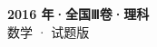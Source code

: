 \documentclass[zihao=-4, a4paper]{ctexart}
\begin{document}
\begin{center}
  {\Large\bfseries 2016 年·全国Ⅲ卷·理科}\\[4pt]
  {\large 数学 · 试题版}
\end{center}
\medskip
{}

\end{document}
